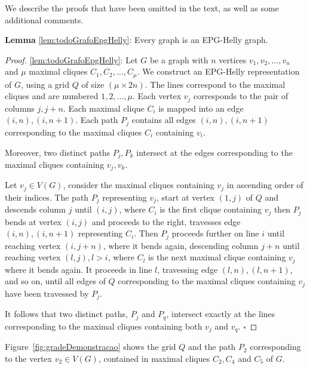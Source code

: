 \documentclass[runningheads]{llncs}
\begin{document}
We describe the proofs that have been omitted in the text, as well as some additional comments.


\begin{lemma*} \textbf{Lemma} \ref{lem:todoGrafoEpgHelly}:
 Every graph is an EPG-Helly graph.
 \end{lemma*}
 
  \begin{proof}  %
  \ref{lem:todoGrafoEpgHelly}:
  Let $G$ be a graph with $n$ vertices $v_1, v_2, \dots, v_n$ and $\mu$ maximal cliques $C_1, C_2, \dots , C_{\mu }$. We construct an EPG-Helly representation of $G$, using a grid $Q$ of size $(\mu \times 2n)$. The lines correspond to the maximal cliques and are numbered $1, 2, \dots , \mu$. Each vertex $v_j$ corresponds to the pair of columns $j, j+n$. Each maximal clique $C_i$ is mapped into an edge $(i,n), (i,n+1)$. Each path $P_j$ contains all edges $(i,n), (i,n+1)$ corresponding to the maximal cliques $C_i$ containing $v_i$.
  
  Moreover, two distinct paths $P_j,P_k$ intersect at the edges corresponding to the maximal cliques containing $v_j,v_k$.
  
  Let $v_j \in V(G)$, consider the maximal cliques containing $v_j$ in ascending order of their indices. The path $P_j$ representing $v_j$, start at vertex $(1,j)$ of $Q$ and descends column $j$ until $(i,j)$, where $C_i$ is the first clique containing $v_j$ then $P_j$ bends at vertex $(i,j)$ and proceeds to the right, travesses edge $(i,n), (i,n+1)$ representing $C_i$. Then $P_j$ proceeds further on line $i$ until reaching vertex $(i, j+n)$, where it bends again, descending column $j+n$ until reaching vertex $(l,j), l>i$, where $C_l$ is the next maximal clique containing $v_j$ where it bends again. It proceeds in line $l$, travessing edge $(l,n),(l,n+1)$, and so on, until all edges of $Q$ corresponding to the maximal cliques containing $v_j$ have been travessed by $P_j$.   
  
It follows that two distinct paths, $P_j$ and $P_q$, intersect exactly at the lines corresponding to the maximal cliques containing both $v_j$ and $v_q$.  
  $\square$ \end{proof}
 
 Figure~\ref{fig:gradeDemonstracao} shows the grid $Q$ and the path $P_2$ corresponding to the vertex $v_2 \in V(G)$, contained in maximal cliques $C_2, C_4$ and $C_5$ of $G$.
 
\end{document}
